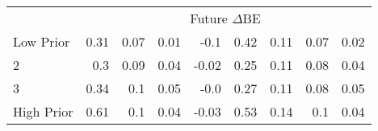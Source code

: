 \begin{table}[!ht]
\begin{tabular}{lrrrrrrrr}
  
    & \multicolumn{8}{c}{Future $\Delta\text{BE}$}  \\
     \cmidrule(r){2-5} \cmidrule(r){6-9}
    Low Prior  & 0.31  & 0.07  & 0.01  & -0.1  & 0.42  & 0.11  & 0.07  & 0.02   \\
    2  & 0.3  & 0.09  & 0.04  & -0.02  & 0.25  & 0.11  & 0.08  & 0.04   \\
    3  & 0.34  & 0.1  & 0.05  & -0.0  & 0.27  & 0.11  & 0.08  & 0.05   \\
    High Prior  & 0.61  & 0.1  & 0.04  & -0.03  & 0.53  & 0.14  & 0.1  & 0.04   \\
    
  
  \bottomrule
\end{tabular}
\label{tbl:Size_BMm_Prior_chars}
\end{table}
